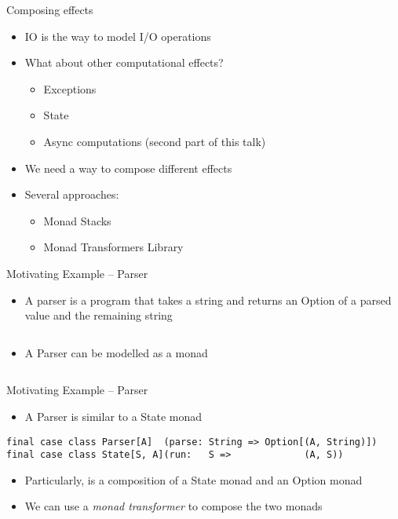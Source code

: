 \documentclass[presentation, 10pt]{beamer}\mode<presentation>{\usetheme{AMSBolognaFC}}
\begin{document}
\begin{frame}{Composing effects}
\begin{itemize}
	\item IO is the way to model I/O operations
	\item What about other computational effects?
	\begin{itemize}
		\item Exceptions
		\item State
		\item Async computations (second part of this talk)
	\end{itemize}
	\item We need a way to compose different effects
	\item Several approaches:
	\begin{itemize}
		\item Monad Stacks
		\item Monad Transformers Library
	\end{itemize}
\end{itemize}
\end{frame}
\begin{frame}[fragile]{Motivating Example -- Parser}
\begin{itemize}
	\item A parser is a program that takes a string and returns an Option of a parsed value and the remaining string
\end{itemize}
\inputminted[firstline=5, lastline=5]{scala}{code/src/main/scala/monads/Parser.scala}
\begin{itemize}
	\item A Parser can be modelled as a monad
\end{itemize}
\inputminted[firstline=7, lastline=17]{scala}{code/src/main/scala/monads/Parser.scala}

\end{frame}
\begin{frame}[fragile]{Motivating Example -- Parser}
\begin{itemize}
	\item A Parser is similar to a State monad
\end{itemize}
\begin{tcolorbox}
\begin{verbatim}
final case class Parser[A]  (parse: String => Option[(A, String)]) 
final case class State[S, A](run:   S =>             (A, S))
\end{verbatim}
\end{tcolorbox}
\begin{itemize}
	\item Particularly, is a composition of a State monad and an Option monad
	\item We can use a \emph{monad transformer} to compose the two monads
\end{itemize}
\end{frame}
\end{document}
